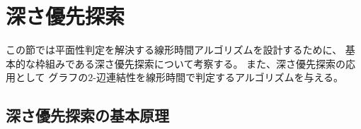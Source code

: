 

\section{深さ優先探索}

この節では平面性判定を解決する線形時間アルゴリズムを設計するために、
基本的な枠組みである深さ優先探索について考察する。
また、深さ優先探索の応用として
グラフの$2$-辺連結性を線形時間で判定するアルゴリズムを与える。






\subsection{深さ優先探索の基本原理}
